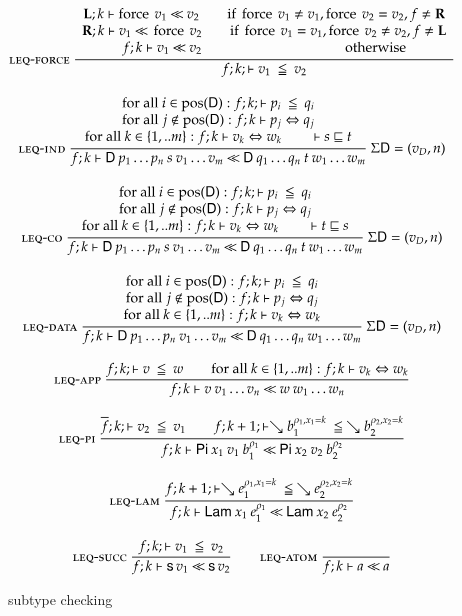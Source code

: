 \begin{figure}[htp]
\begin{gather*}
\mbox{\sc leq-force}\ \dfrac{\begin{array}[b]{c}\mathbf{L};k\vdash\operatorname{force} \: v_1{\:\ll\:}v_2 \qquad \mbox{if } \operatorname{force} \: v_1 \neq v_1 , \operatorname{force} \: v_2 = v_2  , f \neq \mathbf{R}
\\\mathbf{R};k\vdash v_1{\:\ll\:}\operatorname{force} \: v_2 \qquad \mbox{if } \operatorname{force} \: v_1 = v_1 , \operatorname{force} \: v_2 \neq v_2 , f \neq \mathbf{L} \\f;k\vdash v_1{\:\ll\:}v_2 \qquad \qquad \qquad \qquad \qquad \mbox{ otherwise}\end{array}}{f;k;\vdash v_1\:\leqq\:v_2}
\\[2ex]
\mbox{\sc leq-ind}\ \dfrac{\begin{array}[b]{c}\mbox{for all } i \in \mbox{pos}(\mathsf{D}): f;k;\vdash p_i\:\leqq\:q_i 
\\
\mbox{for all } j \notin \mbox{pos}(\mathsf{D}): f;k\vdash p_j\Leftrightarrow q_j 
\\\mbox{for all } k \in \{1,..m\}: f;k\vdash v_k\Leftrightarrow w_k
\qquad
\vdash s\sqsubseteq t \end{array}}{f;k\vdash\mathsf{D} \: p_1 \ldots p_n \: s \: v_1 \ldots v_m{\:\ll\:}\mathsf{D} \: q_1 \ldots q_n \: t \: w_1 \ldots w_m}
{\: \Sigma \mathsf{D} = (v_D,n)}
\\[2ex]
\mbox{\sc leq-co}\ \dfrac{\begin{array}[b]{c}\mbox{for all } i \in \mbox{pos}(\mathsf{D}): f;k;\vdash p_i\:\leqq\:q_i 
\\
\mbox{for all } j \notin \mbox{pos}(\mathsf{D}): f;k\vdash p_j\Leftrightarrow q_j
\\\mbox{for all } k \in \{1,..m\}:f;k\vdash v_k\Leftrightarrow w_k
\qquad
\vdash t\sqsubseteq s \end{array}}{f;k\vdash\mathsf{D} \: p_1 \ldots p_n \: s \: v_1 \ldots v_m{\:\ll\:}\mathsf{D} \: q_1 \ldots q_n \: t \: w_1 \ldots w_m}
{\: \Sigma \mathsf{D} = (v_D,n)} 
\\[2ex]
\mbox{\sc leq-data}\ \dfrac{\begin{array}[b]{c}\mbox{for all } i \in \mbox{pos}(\mathsf{D}): f;k;\vdash p_i\:\leqq\:q_i 
\\
\mbox{for all } j \notin \mbox{pos}(\mathsf{D}): f;k\vdash p_j\Leftrightarrow q_j\\\mbox{for all } k \in \{1,..m\}:f;k\vdash v_k\Leftrightarrow w_k\end{array}}{f;k\vdash\mathsf{D} \: p_1 \ldots p_n \: v_1 \ldots v_m{\:\ll\:}\mathsf{D} \: q_1 \ldots q_n \: w_1 \ldots w_m}
{\:\Sigma \mathsf{D} = (v_D,n) }
\\[2ex]
\mbox{\sc leq-app}\ \dfrac{f;k;\vdash v\:\leqq\:w \qquad
\mbox{for all } k \in \{1,..m\}:f;k\vdash v_k\Leftrightarrow w_k}{f;k\vdash v \: v_1 \ldots v_n{\:\ll\:}w \: w_1 \ldots w_n}
\\[2ex]
\mbox{\sc leq-pi}\ \dfrac{\overline{f};k;\vdash v_2\:\leqq\:v_1
\qquad
f;k+1;\vdash\searrow b_1^{\rho_1,x_1=k}\:\leqq\:\searrow b_2^{\rho_2,x_2=k}}{f;k\vdash\mathsf{Pi} \: x_1 \: v_1 \: b_1^{\rho_1}{\:\ll\:}\mathsf{Pi} \: x_2 \: v_2 \: b_2^{\rho_2}}
\\[2ex]
\mbox{\sc leq-lam}\ \dfrac{f;k+1;\vdash\searrow e_1^{\rho_1,x_1=k}\:\leqq\:\searrow e_2^{\rho_2,x_2=k}}{f;k\vdash\mathsf{Lam} \: x_1 \: e_1^{\rho_1}{\:\ll\:}\mathsf{Lam} \: x_2 \: e_2^{\rho_2}}
\\[2ex]
\mbox{\sc leq-succ}\ \dfrac{f;k;\vdash v_1\:\leqq\:v_2}{f;k\vdash\mathsf{s}\, v_1{\:\ll\:}\mathsf{s}\, v_2}
\qquad
\mbox{\sc leq-atom}\ \dfrac{}{f;k\vdash a{\:\ll\:}a}
\end{gather*}
\caption{subtype checking}
\label{fsub}
\end{figure}

